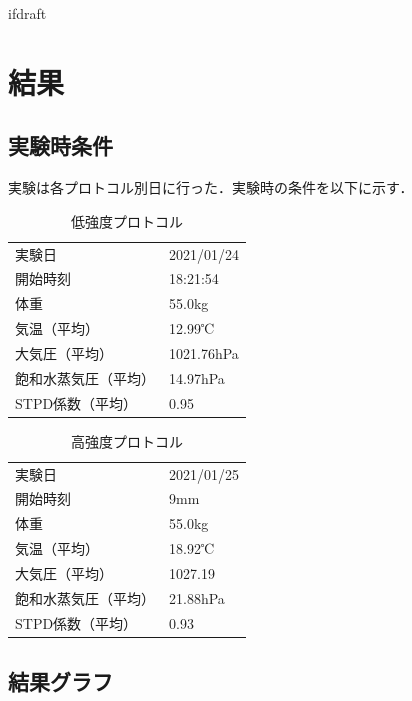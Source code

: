 \expandafter\ifx\csname ifdraft\endcsname\relax
 
\fi

\section{結果}

\subsection{実験時条件}

実験は各プロトコル別日に行った．実験時の条件を以下に示す．

\begin{table}[H]
  \begin{center}
  \caption{低強度プロトコル}
  \label{tb:light_experiment}
    \begin{tabular}{ll}
      実験日 & 2021/01/24 \\
      開始時刻 & 18:21:54 \\
      体重 & 55.0kg \\
      気温（平均） & 12.99℃ \\
      大気圧（平均） & 1021.76hPa \\
      飽和水蒸気圧（平均） & 14.97hPa　\\
      STPD係数（平均） & 0.95
    \end{tabular}
  \end{center}
\end{table}

\begin{table}[H]
  \begin{center}
  \caption{高強度プロトコル}
  \label{tb:hard_experiment}
    \begin{tabular}{ll}
      実験日 & 2021/01/25 \\
      開始時刻 & 9mm \\
      体重 & 55.0kg \\
      気温（平均） & 18.92℃ \\
      大気圧（平均） & 1027.19 \\
      飽和水蒸気圧（平均） & 21.88hPa　\\
      STPD係数（平均） & 0.93
    \end{tabular}
  \end{center}
\end{table}

\subsection{結果グラフ}

